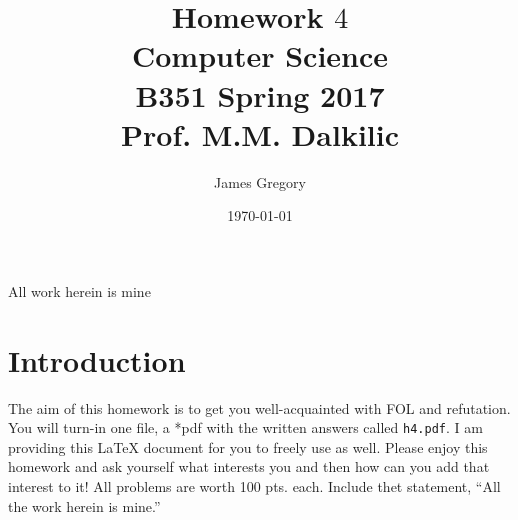 \documentclass{article}
\begin{document}
\title{Homework $4$\\ Computer Science \\ B351 Spring 2017\\ Prof. M.M. Dalkilic}         %
\author{James Gregory}        %
\date{\today}          %
\maketitle


\makeatother     %




\pagestyle{plain}
All work herein is mine
\section*{Introduction}
The aim of this homework is to get you well-acquainted with FOL and refutation.  You will turn-in one file, a *pdf with the written answers called \texttt{h4.pdf}.   I am providing this \LaTeX{} document for you to freely use as well.  Please enjoy this homework and ask yourself what interests you and then how can you add that interest to it!  All problems are worth 100 pts. each.  Include thet statement, ``All the work herein is mine.''
\newpage
\end{document}
